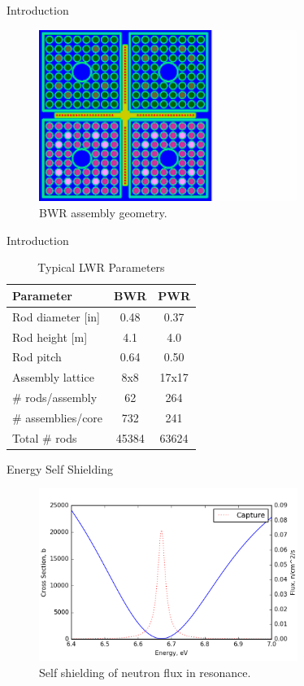 \documentclass[presentation]{beamer}
\begin{document}
\begin{frame}[label={sec:orgheadline7}]{Introduction}
\begin{figure}
  \centering
  \includegraphics[width=0.75\textwidth]{bwr_fa.png}
  \caption{BWR assembly geometry.}
\end{figure}
\end{frame}
\begin{frame}[label={sec:orgheadline8}]{Introduction}
\begin{table}[]
\centering
\caption{Typical LWR Parameters}
\label{my-label}
\begin{tabular}{|l|c|c|}
\hline
Parameter             & BWR   & PWR   \\
\hline
Rod diameter {[}in{]} & 0.48  & 0.37  \\
Rod height {[}m{]}    & 4.1   & 4.0   \\
Rod pitch             & 0.64  & 0.50  \\
Assembly lattice      & 8x8   & 17x17 \\
\# rods/assembly      & 62    & 264   \\
\# assemblies/core    & 732   & 241   \\
Total \# rods         & 45384 & 63624 \\
\hline
\end{tabular}
\end{table}
\end{frame}
\begin{frame}[label={sec:orgheadline9}]{Energy Self Shielding}
\begin{figure}
  \centering
  \includegraphics[width=0.75\textwidth]{../notebooks/selfshielding.png}
  \caption{Self shielding of neutron flux in resonance.}
\end{figure}
\end{frame}
\end{document}
